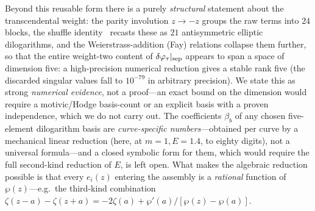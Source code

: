 \documentclass[12pt]{iopart}
\begin{document}
Beyond this reusable form there is a purely \emph{structural} statement about the
transcendental weight: the parity involution $z\to-z$ groups the raw terms into
$24$ blocks, the shuffle identity~\cite{Chen1977} recasts these as $21$
antisymmetric elliptic dilogarithms, and the Weierstrass-addition (Fay) relations
collapse them further, so that the entire weight-two content of
$\delta\varphi_\tau|_{\rm sep}$ appears to span a space of dimension five: a
high-precision numerical reduction gives a stable rank five (the discarded singular
values fall to $10^{-79}$ in arbitrary precision). We state this as strong
\emph{numerical evidence}, not a proof---an exact bound on the dimension would
require a motivic/Hodge basis-count or an explicit basis with a proven
independence, which we do not carry out. The coefficients $\beta_b$ of any chosen
five-element dilogarithm basis are \emph{curve-specific numbers}---obtained per curve by a
mechanical linear reduction (here, at $m=1,E=1.4$, to eighty digits), not a
universal formula---and a closed symbolic form for them, which would require the
full second-kind reduction of $E$, is left open. What makes the algebraic reduction
possible is that every $e_i(z)$ entering the assembly is a \emph{rational} function
of $\wp(z)$---e.g.\ the third-kind combination
$\zeta(z-a)-\zeta(z+a)=-2\zeta(a)+\wp'(a)/[\wp(z)-\wp(a)]$.
\end{document}
